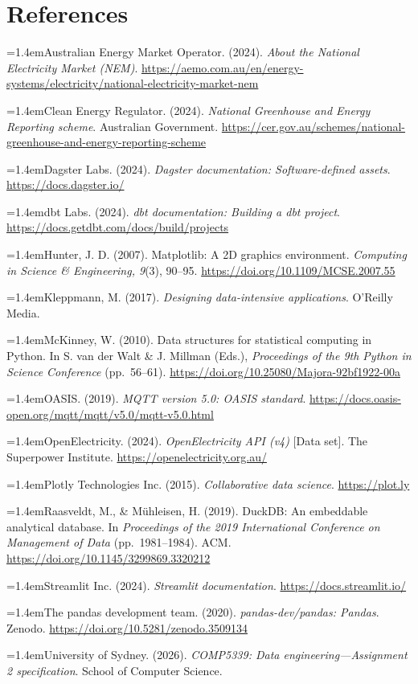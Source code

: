 \documentclass[onecolumn,11pt]{IEEEtran}
\newcommand{\apaitem}[1]{\par\hangindent=1.4em\hangafter=1\noindent #1\par\vspace{2pt}}
\begin{document}
\section*{References}
\footnotesize
\apaitem{Australian Energy Market Operator. (2024). \textit{About the National Electricity Market (NEM)}. \url{https://aemo.com.au/en/energy-systems/electricity/national-electricity-market-nem}}
\apaitem{Clean Energy Regulator. (2024). \textit{National Greenhouse and Energy Reporting scheme}. Australian Government. \url{https://cer.gov.au/schemes/national-greenhouse-and-energy-reporting-scheme}}
\apaitem{Dagster Labs. (2024). \textit{Dagster documentation: Software-defined assets}. \url{https://docs.dagster.io/}}
\apaitem{dbt Labs. (2024). \textit{dbt documentation: Building a dbt project}. \url{https://docs.getdbt.com/docs/build/projects}}
\apaitem{Hunter, J. D. (2007). Matplotlib: A 2D graphics environment. \textit{Computing in Science \& Engineering, 9}(3), 90--95. \url{https://doi.org/10.1109/MCSE.2007.55}}
\apaitem{Kleppmann, M. (2017). \textit{Designing data-intensive applications}. O'Reilly Media.}
\apaitem{McKinney, W. (2010). Data structures for statistical computing in Python. In S. van der Walt \& J. Millman (Eds.), \textit{Proceedings of the 9th Python in Science Conference} (pp.\ 56--61). \url{https://doi.org/10.25080/Majora-92bf1922-00a}}
\apaitem{OASIS. (2019). \textit{MQTT version 5.0: OASIS standard}. \url{https://docs.oasis-open.org/mqtt/mqtt/v5.0/mqtt-v5.0.html}}
\apaitem{OpenElectricity. (2024). \textit{OpenElectricity API (v4)} [Data set]. The Superpower Institute. \url{https://openelectricity.org.au/}}
\apaitem{Plotly Technologies Inc. (2015). \textit{Collaborative data science}. \url{https://plot.ly}}
\apaitem{Raasveldt, M., \& M\"uhleisen, H. (2019). DuckDB: An embeddable analytical database. In \textit{Proceedings of the 2019 International Conference on Management of Data} (pp.\ 1981--1984). ACM. \url{https://doi.org/10.1145/3299869.3320212}}
\apaitem{Streamlit Inc. (2024). \textit{Streamlit documentation}. \url{https://docs.streamlit.io/}}
\apaitem{The pandas development team. (2020). \textit{pandas-dev/pandas: Pandas}. Zenodo. \url{https://doi.org/10.5281/zenodo.3509134}}
\apaitem{University of Sydney. (2026). \textit{COMP5339: Data engineering---Assignment 2 specification}. School of Computer Science.}
\end{document}

